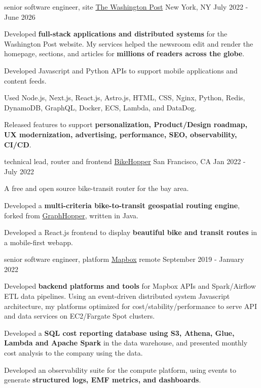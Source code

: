 
\begin{cventries}
  \cventry
    {senior software engineer, site}
    {\href{https://www.washingtonpost.com/}{The Washington Post}}
    {New York, NY}
    {July 2022 - June 2026}
    {
      \begin{cvitems} %
        \item {Developed \textbf{full-stack applications and distributed systems} for the Washington Post website. My services helped the newsroom edit and render the homepage, sections, and articles for \textbf{millions of readers across the globe}.}
        \item {Developed Javascript and Python APIs to support mobile applications and content feeds.}
        \item {Used Node.js, Next.js, React.js, Astro.js, HTML, CSS, Nginx, Python, Redis, DynamoDB, GraphQL, Docker, ECS, Lambda, and DataDog.}
        \item {Released features to support \textbf{personalization, Product/Design roadmap, UX modernization, advertising, performance, SEO, observability, CI/CD}.}
      \end{cvitems}
    }

  \cventry
    {technical lead, router and frontend}
    { \href{https://www.bikehopper.org}{BikeHopper} }
    {San Francisco, CA}
    {Jan 2022 - July 2022}
    {
      \begin{cvitems} %
        \item {A free and open source bike-transit router for the bay area.}
        \item {Developed a \textbf{multi-criteria bike-to-transit geospatial routing engine}, forked from \href{https://graphhopper.com}{GraphHopper}, written in Java.}
        \item {Developed a React.js frontend to display \textbf{beautiful bike and transit routes} in a mobile-first webapp.}
      \end{cvitems}
    }

  \cventry
    {senior software engineer, platform}
    {\href{https://www.mapbox.com/}{Mapbox}}
    {remote}
    {September 2019 - January 2022}
    {
      \begin{cvitems} %
        \item {Developed \textbf{backend platforms and tools} for Mapbox APIs and Spark/Airflow ETL data pipelines. Using an event-driven distributed system Javascript architecture, my platforms optimized for cost/stability/performance to serve API and data services on EC2/Fargate Spot clusters.}
        \item {Developed a \textbf{SQL cost reporting database using S3, Athena, Glue, Lambda and Apache Spark} in the data warehouse, and presented monthly cost analysis to the company using the data.}
        \item {Developed an observability suite for the compute platform, using events to generate \textbf{structured logs, EMF metrics, and dashboards}.}
      \end{cvitems}
    }


\end{cventries}
